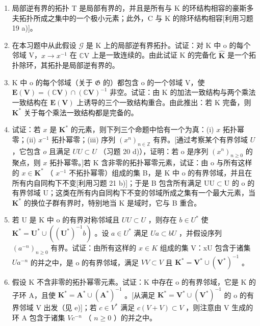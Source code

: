 \begin{enumerate}
\def\labelenumi{\alph{enumi})}
\item
  局部逆有界的拓扑 T 是局部有界的，并且是所有与 K 的环结构相容的豪斯多夫拓扑所成之集中的一个极小元素；此外，C 与 K 的除环结构相容{[}利用习题 19 a){]}。
\item
  在本习题中从此假设 \(\mathcal{G}\) 是 K 上的局部逆有界拓扑。试证：对 K 中 o 的每个邻域 V，\(x \to x^{-1}\) 在 \(\mathbb{C}\mathrm{V}\) 上是一致连续的。由此试证 K 的完备化 \(\hat{\mathbf{K}}\) 是一个拓扑除环，其拓扑是局部逆有界的。
\item
  K 中 o 的每个邻域（关于 \(\mathfrak{G}\) 的）都包含 o 的一个邻域 V，使 \(\mathbf{E}(\mathbf{V}) = (\mathbb{C}\mathbf{V}) \cap (\mathbb{C}\mathbf{V})^{-1}\) 非空。试证：由 K 的加法一致结构与两个乘法一致结构在 \(\mathbf{E}(\mathbf{V})\) 上诱导的三个一致结构重合。由此推出：若 K 完备，则 \(\mathbf{K}^*\) 关于每个乘法一致结构都是完备的。
\item
  试证：若 \(x\) 是 \(\mathbf{K}^*\) 的元素，则下列三个命题中恰有一个为真：(i) \(x\) 拓扑幂零；(ii) \(x^{-1}\) 拓扑幂零；(iii) 序列 \((x^n)_{n\in \mathbb{Z}}\) 有界。{[}通过考察某个有界邻域 \(U\) ，它包含 \(o\) 且满足 \(UU\subset U\) （习题 20 d)），证明：若 o 是序列 \((x^n)_{n\geqslant 0}\) 的聚点，则 \(x\) 拓扑幂零。{]}若 K 含非零的拓扑幂零元素，试证：由 o 与所有这样的 \(x\in \mathbf{K}^*\) （ \(x^{-1}\) 不拓扑幂零）组成的集 B，是 K 中 o 的有界邻域，并且在所有内自同构下不变{[}利用习题 21 b){]}；于是 B 包含所有满足 \(\mathrm{UU}\subset \mathrm{U}\) 的 o 的有界邻域 U；这类在所有内自同构下不变的邻域所成之集有一个最大元素，当 \(\mathbf{K}^*\) 的换位子群有界时，特别地当 K 是域时，它与 B 重合。
\item
  若 U 是 K 中 o 的有界对称邻域且 \(UU \subset U\) ，则存在 \(b \in U^{*}\) 使 \(\mathbf{K}^{*} = \mathbf{U}^{*} \cup ((\mathbf{U}^{*})^{-1} b)\) 。设 \(a \in U^{*}\) 满足 \(Ua \subset bU\) ，并假设序列 \((a^{-n})_{n \geqslant 0}\) 有界。试证：由所有这样的 \(x \in K\) 组成的集 V：xU 包含于诸集 \(Ua^{-n}\) 的并之中，是 o 的有界邻域，满足 \(VV \subset V\) 且 \(\mathbf{K}^{*} = \mathbf{V}^{*} \cup (\mathbf{V}^{*})^{-1}\) 。
\item
  假设 K 不含非零的拓扑幂零元素。试证：K 中存在 o 的有界邻域，它是 K 的子环 A，且使 \(\mathbf{K}^{*} = \mathbf{A}^{*} \cup (\mathbf{A}^{*})^{-1}\) 。{[}从满足 \(\mathbf{K}^{*} = \mathbf{V}^{*} \cup (\mathbf{V}^{*})^{-1}\) 的 o 的有界邻域 V 出发（见 e){]}；若 \(c \in V^{*}\) 满足 \(c(V + V) \subset V\) ，则注意由 V 生成的环 A 包含于诸集 \(Vc^{-n}\) （ \(n \geqslant 0\) ）的并之中。
\end{enumerate}


